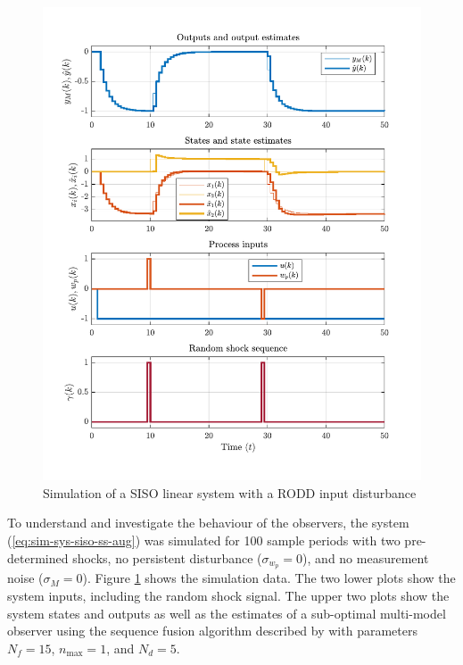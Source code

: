 \begin{figure}[htp]
	\centering
	\includegraphics[width=13cm]{images/rod_MKF_SF_test_sim_MKF_SF95_ioplot.pdf}
	\caption{Simulation of a SISO linear system with a \gls{RODD} input disturbance}
	\label{fig:rod-obs-sim-test-ioplot-SF95}
\end{figure}
To understand and investigate the behaviour of the observers, the system (\ref{eq:sim-sys-siso-ss-aug}) was simulated for 100 sample periods with two pre-determined shocks, no persistent disturbance ($\sigma_{w_p}=0$), and no measurement noise ($\sigma_M=0$). Figure \ref{fig:rod-obs-sim-test-ioplot-SF95} shows the simulation data. The two lower plots show the system inputs, including the random shock signal. The upper two plots show the system states and outputs as well as the estimates of a sub-optimal multi-model observer using the sequence fusion algorithm described by \cite{robertson_detection_1995} with parameters $N_f=15$, $n_\text{max}=1$, and $N_d=5$.

